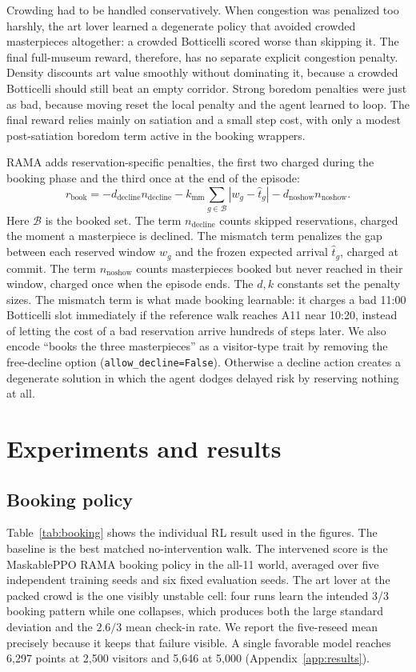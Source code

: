 \documentclass[11pt]{article}
\newcommand{\code}[1]{\texttt{\small #1}}
\begin{document}
Crowding had to be handled conservatively. When congestion was penalized too harshly, the art lover
learned a degenerate policy that avoided crowded masterpieces altogether: a crowded Botticelli scored
worse than skipping it. The final full-museum reward, therefore, has no separate explicit congestion
penalty. Density discounts art value smoothly without dominating it, because a crowded Botticelli
should still beat an empty corridor. Strong boredom penalties were just as bad, because moving reset
the local penalty and the agent learned to loop. The final reward relies mainly on satiation and a
small step cost, with only a modest post-satiation boredom term active in the booking wrappers.

RAMA adds reservation-specific penalties, the first two charged during the booking phase and the third
once at the end of the episode:
\[
r_{\text{book}} =
-d_{\text{decline}}n_{\text{decline}}
-k_{\text{mm}}\sum_{g\in \mathcal{B}} |w_g-\hat t_g|
-d_{\text{noshow}}n_{\text{noshow}}.
\]
Here $\mathcal B$ is the booked set. The term $n_{\text{decline}}$ counts skipped reservations, charged
the moment a masterpiece is declined. The mismatch term penalizes the gap between each reserved window
$w_g$ and the frozen expected arrival $\hat t_g$, charged at commit. The term $n_{\text{noshow}}$ counts
masterpieces booked but never reached in their window, charged once when the episode ends. The $d,k$
constants set the penalty sizes. The mismatch term is what made booking learnable: it charges a bad
11:00 Botticelli slot immediately if the reference walk reaches A11 near 10:20, instead of letting the
cost of a bad reservation arrive hundreds of steps later. We also encode ``books the
three masterpieces'' as a visitor-type trait by removing the free-decline option
(\code{allow\_decline=False}). Otherwise a decline action creates a degenerate solution in which the
agent dodges delayed risk by reserving nothing at all.

\section{Experiments and results}
\label{sec:results}

\subsection{Booking policy}

Table~\ref{tab:booking} shows the individual RL result used in the figures. The baseline is the best
matched no-intervention walk. The intervened score is the MaskablePPO RAMA booking policy in the
all-11 world, averaged over five independent training seeds and six fixed evaluation seeds. The art
lover at the packed crowd is the one visibly unstable cell: four runs learn the intended 3/3 booking
pattern while one collapses, which produces both the large standard deviation and the $2.6/3$ mean
check-in rate. We report the five-reseed mean precisely because it keeps that failure visible. A single
favorable model reaches 6,297 points at 2,500 visitors and 5,646 at 5,000 (Appendix~\ref{app:results}).
\end{document}

